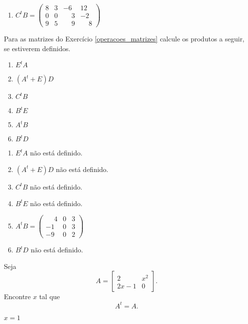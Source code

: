 \documentclass[12pt]{exam}
\begin{document}
\begin{exercicio}
\begin{solucao}
\begin{enumerate}
            \item $C^tB = \begin{pmatrix}8 & 3 & -6 & 12\\0 & 0 & \phantom{-} 3 & -2\\9 & 5 & \phantom{-} 9 & \phantom{-} 8\end{pmatrix}$
        \end{enumerate}
    \end{solucao}
\end{exercicio}

\begin{exercicio}
    Para as matrizes do Exercício \ref{operacoes_matrizes} calcule os produtos a seguir, se estiverem definidos.
    \begin{multicols}{2}
        \begin{enumerate}[label={\alph*})]
            \item $E^tA$
            \item $(A^t + E)D$
            \item $C^tB$
            \item $B^tE$
            \item $A^tB$
            \item $B^tD$
        \end{enumerate}
    \end{multicols}
    \begin{solucao}
        \begin{enumerate}[label={\alph*})]
            \item $E^tA$ não está definido.
            \item $(A^t + E)D$ não está definido.
            \item $C^tB$ não está definido.
            \item $B^tE$ não está definido.
            \item $A^tB = \begin{pmatrix}\phantom{-} 4 & 0 & 3\\-1 & 0 & 3\\-9 & 0 & 2\end{pmatrix}$
            \item $B^tD$ não está definido.
        \end{enumerate}
    \end{solucao}
\end{exercicio}

\begin{exercicio}
    Seja
    \[
        A = \begin{bmatrix}2 & x^2\\2x - 1 & 0\end{bmatrix}.
    \]
    Encontre $x$ tal que
    \[
        A^t = A.
    \]
    \begin{solucao}
        $x = 1$
    \end{solucao}
\end{exercicio}
\end{document}
